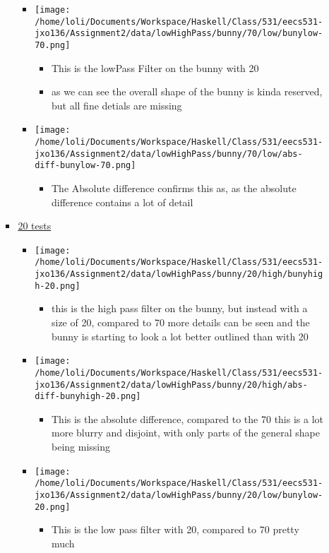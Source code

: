 \documentclass{article}
\begin{document}
\begin{enumerate}
\begin{enumerate}
\begin{itemize}
\begin{itemize}
\begin{itemize}
\end{itemize}
\item \texttt{[image: /home/loli/Documents/Workspace/Haskell/Class/531/eecs531-jxo136/Assignment2/data/lowHighPass/bunny/70/low/bunylow-70.png]}
\begin{itemize}
\item This is the lowPass Filter on the bunny with 20
\item as we can see the overall shape of the bunny is kinda reserved,
but all fine detials are missing
\end{itemize}
\item \texttt{[image: /home/loli/Documents/Workspace/Haskell/Class/531/eecs531-jxo136/Assignment2/data/lowHighPass/bunny/70/low/abs-diff-bunylow-70.png]}
\begin{itemize}
\item The Absolute difference confirms this as, as the absolute
difference contains a lot of detail
\end{itemize}
\end{itemize}
\item \uline{20 tests}
\begin{itemize}
\item \texttt{[image: /home/loli/Documents/Workspace/Haskell/Class/531/eecs531-jxo136/Assignment2/data/lowHighPass/bunny/20/high/bunyhigh-20.png]}
\begin{itemize}
\item this is the high pass filter on the bunny, but instead with a
size of 20, compared to 70 more details can be seen and the bunny
is starting to look a lot better outlined than with 20
\end{itemize}
\item \texttt{[image: /home/loli/Documents/Workspace/Haskell/Class/531/eecs531-jxo136/Assignment2/data/lowHighPass/bunny/20/high/abs-diff-bunyhigh-20.png]}
\begin{itemize}
\item This is the absolute difference, compared to the 70 this is a
lot more blurry and disjoint, with only parts of the general shape
being missing
\end{itemize}
\item \texttt{[image: /home/loli/Documents/Workspace/Haskell/Class/531/eecs531-jxo136/Assignment2/data/lowHighPass/bunny/20/low/bunylow-20.png]}
\begin{itemize}
\item This is the low pass filter with 20, compared to 70 pretty much

\end{itemize}
\end{itemize}
\end{itemize}
\end{enumerate}
\end{enumerate}
\end{document}
